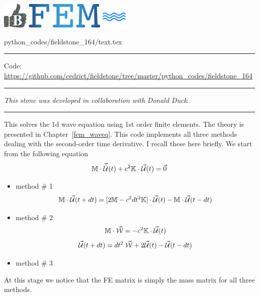 \noindent
\includegraphics[height=1.25cm]{images/pictograms/benchmark}
\includegraphics[height=1.25cm]{images/pictograms/FEM}
\includegraphics[height=1.25cm]{images/pictograms/wave}


\begin{flushright} {\tiny {\color{gray} python\_codes/fieldstone\_164/text.tex}} \end{flushright}

%

\par\noindent\rule{\textwidth}{0.4pt}

\begin{center}
\inpython
{\small Code: \url{https://github.com/cedrict/fieldstone/tree/master/python_codes/fieldstone_164}}
\end{center}

\par\noindent\rule{\textwidth}{0.4pt}

{\sl This stone was developed in collaboration with Donald Duck}. 

\par\noindent\rule{\textwidth}{0.4pt}


This \stone solves the 1d wave equation using 1st order finite elements. 
The theory is presented in Chapter~\ref{fem_waveq}. 
This code implements all three methods dealing with the second-order time derivative. 
I recall these here briefly.
We start from the following equation
\[
{\mathbb{M}} \cdot \vec{\ddot{{\cal U}}}(t) + c^2 {\mathbb{K}} \cdot \vec{\cal U}(t) = \vec{0}
\]

\begin{itemize}
\item method \# 1
\[
{\mathbb{M}} \cdot  \vec{\cal U}(t+dt)
= [2  {\mathbb{M}}  - c^2 dt^2 {\mathbb{K}}  ]  \cdot \vec{\cal U}(t) - {\mathbb{M}} \cdot \vec{\cal U}(t-dt)
\]

\item method \# 2 
\[
{\mathbb{M}} \cdot \vec{\cal W}= -c^2 {\mathbb{K}} \cdot \vec{\cal U}(t)
\]
\[
\vec{\cal U}(t+dt) = dt^2 \; \vec{\cal W} +2 \vec{\cal U}(t) - \vec{\cal U}(t-dt)
\]

\item method \# 3 
\end{itemize}
At this stage we notice that the FE matrix is simply the 
mass matrix for all three methods. 



